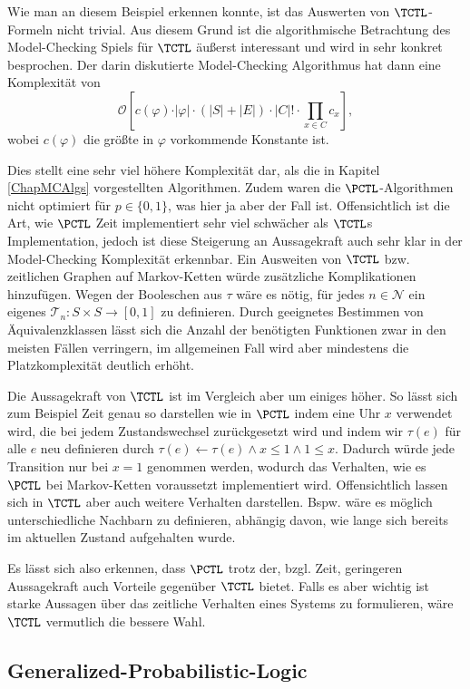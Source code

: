 Wie man an diesem Beispiel erkennen konnte, ist das Auswerten von $\TCTL$-Formeln nicht trivial.
Aus diesem Grund ist die algorithmische Betrachtung des Model-Checking Spiels für $\TCTL$ äußerst interessant und wird in \cite{alur1990model} sehr konkret besprochen.
Der darin diskutierte Model-Checking Algorithmus hat dann eine Komplexität von 
$$\mathcal{O}\left[c(\varphi)\cdot \vert\varphi\vert \cdot (|S|+|E|) \cdot |C|! \cdot \prod_{x\in C}c_x\right],$$ 
wobei $c(\varphi)$ die größte in $\varphi$ vorkommende Konstante ist. \cite{alur1990model}

Dies stellt eine sehr viel höhere Komplexität dar, als die in Kapitel \ref{ChapMCAlgs} vorgestellten Algorithmen.
Zudem waren die $\PCTL$-Algorithmen nicht optimiert für $p\in \{0,1\}$, was hier ja aber der Fall ist.
Offensichtlich ist die Art, wie $\PCTL$ Zeit implementiert sehr viel schwächer als $\TCTL$s Implementation, jedoch ist diese Steigerung an Aussagekraft auch sehr klar in der Model-Checking Komplexität erkennbar.
Ein Ausweiten von $\TCTL$ bzw. zeitlichen Graphen auf Markov-Ketten würde zusätzliche Komplikationen hinzufügen.
Wegen der Booleschen aus $\tau$ wäre es nötig, für jedes $n\in \mathcal{N}$ ein eigenes $\mathcal{T}_n:S\times S\to [0,1]$ zu definieren.
Durch geeignetes Bestimmen von Äquivalenzklassen lässt sich die Anzahl der benötigten Funktionen zwar in den meisten Fällen verringern, im allgemeinen Fall wird aber mindestens die Platzkomplexität deutlich erhöht.

Die Aussagekraft von $\TCTL$ ist im Vergleich aber um einiges höher.
So lässt sich zum Beispiel Zeit genau so darstellen wie in $\PCTL$ indem eine Uhr $x$ verwendet wird, die bei jedem Zustandswechsel zurückgesetzt wird und indem wir $\tau(e)$ für alle $e$ neu definieren durch $\tau(e)\gets \tau(e) \land x\leq 1 \land 1\leq x$.
Dadurch würde jede Transition nur bei $x=1$ genommen werden, wodurch das Verhalten, wie es $\PCTL$ bei Markov-Ketten voraussetzt implementiert wird.
Offensichtlich lassen sich in $\TCTL$ aber auch weitere Verhalten darstellen.
Bspw. wäre es möglich unterschiedliche Nachbarn zu definieren, abhängig davon, wie lange sich bereits im aktuellen Zustand aufgehalten wurde.

Es lässt sich also erkennen, dass $\PCTL$ trotz der, bzgl. Zeit, geringeren Aussagekraft auch Vorteile gegenüber $\TCTL$ bietet.
Falls es aber wichtig ist starke Aussagen über das zeitliche Verhalten eines Systems zu formulieren, wäre $\TCTL$ vermutlich die bessere Wahl.


\subsection{Generalized-Probabilistic-Logic}

